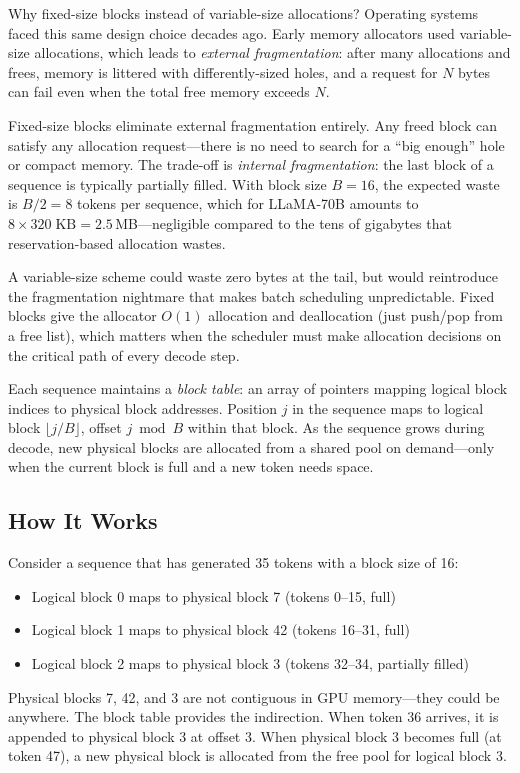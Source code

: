 \begin{whynotbox}{Why fixed-size blocks instead of variable-size allocations?}
Operating systems faced this same design choice decades ago. Early memory allocators used variable-size allocations, which leads to \emph{external fragmentation}: after many allocations and frees, memory is littered with differently-sized holes, and a request for $N$ bytes can fail even when the total free memory exceeds $N$.

Fixed-size blocks eliminate external fragmentation entirely. Any freed block can satisfy any allocation request---there is no need to search for a ``big enough'' hole or compact memory. The trade-off is \emph{internal fragmentation}: the last block of a sequence is typically partially filled. With block size $B = 16$, the expected waste is $B/2 = 8$ tokens per sequence, which for LLaMA-70B amounts to $8 \times 320\;\text{KB} = 2.5$\,MB---negligible compared to the tens of gigabytes that reservation-based allocation wastes.

A variable-size scheme could waste zero bytes at the tail, but would reintroduce the fragmentation nightmare that makes batch scheduling unpredictable. Fixed blocks give the allocator $O(1)$ allocation and deallocation (just push/pop from a free list), which matters when the scheduler must make allocation decisions on the critical path of every decode step.
\end{whynotbox}

Each sequence maintains a \emph{block table}: an array of pointers mapping logical block indices to physical block addresses. Position $j$ in the sequence maps to logical block $\lfloor j / B \rfloor$, offset $j \bmod B$ within that block. As the sequence grows during decode, new physical blocks are allocated from a shared pool on demand---only when the current block is full and a new token needs space.

\subsection{How It Works}

Consider a sequence that has generated 35 tokens with a block size of 16:
\begin{itemize}
  \item Logical block 0 maps to physical block 7 (tokens 0--15, full)
  \item Logical block 1 maps to physical block 42 (tokens 16--31, full)
  \item Logical block 2 maps to physical block 3 (tokens 32--34, partially filled)
\end{itemize}
Physical blocks 7, 42, and 3 are not contiguous in GPU memory---they could be anywhere. The block table provides the indirection. When token 36 arrives, it is appended to physical block 3 at offset 3. When physical block 3 becomes full (at token 47), a new physical block is allocated from the free pool for logical block 3.

